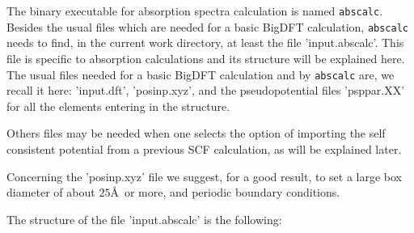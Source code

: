 \documentclass[a4paper,11pt]{report}
\begin{document}
The binary executable for absorption spectra calculation is named \texttt{abscalc}.
 Besides the usual files which  are needed for
a basic BigDFT calculation,  \texttt{abscalc} needs to find, 
 in the current  work directory, at least the file  '{input.abscalc}'. 
This file is specific to absorption calculations and 
its structure will be explained here.
The  usual files needed for a basic BigDFT calculation and by \texttt{abscalc} are, 
we recall it here: '{input.dft}', '{posinp.xyz}', and the pseudopotential files '{psppar.XX}' for
all the elements entering in the structure.

Others files may be needed when one selects the option of importing
the self consistent potential from a previous SCF calculation, as will
be explained later. 

Concerning the '{posinp.xyz}' file we suggest, for a good result,
to set a large box diameter of about $25$\AA\ or more, and periodic
boundary conditions.

The structure of the file '{input.abscalc}' is the following:
\end{document}

